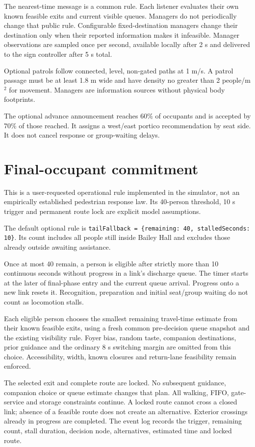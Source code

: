 \documentclass[11pt,a4paper]{article}
\begin{document}
The nearest-time message is a common rule. Each listener evaluates their own known feasible exits and current visible queues. Managers do not periodically change that public rule. Configurable fixed-destination managers change their destination only when their reported information makes it infeasible. Manager observations are sampled once per second, available locally after 2 s and delivered to the sign controller after 5 s total.

Optional patrols follow connected, level, non-gated paths at 1 m/s. A patrol passage must be at least 1.8 m wide and have density no greater than 2 people/m$^2$ for movement. Managers are information sources without physical body footprints.

The optional advance announcement reaches 60\% of occupants and is accepted by 70\% of those reached. It assigns a west/east portico recommendation by seat side. It does not cancel response or group-waiting delays.

\section{Final-occupant commitment}
This is a user-requested operational rule implemented in the simulator, not an empirically established pedestrian response law. Its 40-person threshold, 10 s trigger and permanent route lock are explicit model assumptions.~\cite{implementation}

The default optional rule is \texttt{tailFallback = \{remaining: 40, stalledSeconds: 10\}}. Its count includes all people still inside Bailey Hall and excludes those already outside awaiting assistance.

Once at most 40 remain, a person is eligible after strictly more than 10 continuous seconds without progress in a link's discharge queue. The timer starts at the later of final-phase entry and the current queue arrival. Progress onto a new link resets it. Recognition, preparation and initial seat/group waiting do not count as locomotion stalls.

Each eligible person chooses the smallest remaining travel-time estimate from their known feasible exits, using a fresh common pre-decision queue snapshot and the existing visibility rule. Foyer bias, random taste, companion destinations, prior guidance and the ordinary 8 s switching margin are omitted from this choice. Accessibility, width, known closures and return-lane feasibility remain enforced.

The selected exit and complete route are locked. No subsequent guidance, companion choice or queue estimate changes that plan. All walking, FIFO, gate-service and storage constraints continue. A locked route cannot cross a closed link; absence of a feasible route does not create an alternative. Exterior crossings already in progress are completed. The event log records the trigger, remaining count, stall duration, decision node, alternatives, estimated time and locked route.
\end{document}
